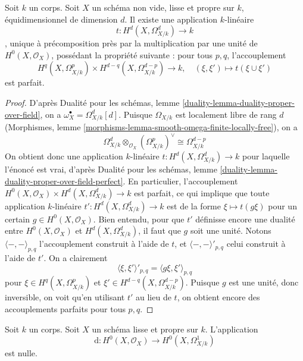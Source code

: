 \begin{lemma}
\label{lemma-duality-hodge}
Soit $k$ un corps. Soit $X$ un schéma non vide, lisse et propre sur $k$,
équidimensionnel de dimension $d$. Il existe une application $k$-linéaire
$$
t : H^d(X, \Omega^d_{X/k}) \longrightarrow k
$$,
unique à précomposition près par la multiplication par une unité de
$H^0(X, \mathcal{O}_X)$, possédant la propriété suivante : pour tous $p, q$, l'accouplement
$$
H^q(X, \Omega^p_{X/k}) \times H^{d - q}(X, \Omega^{d - p}_{X/k})
\longrightarrow
k, \quad
(\xi, \xi') \longmapsto t(\xi \cup \xi')
$$
est parfait.
\end{lemma}

\begin{proof}
D'après Dualité pour les schémas, lemme \ref{duality-lemma-duality-proper-over-field},
on a $\omega_X^\bullet = \Omega^d_{X/k}[d]$.
Puisque $\Omega_{X/k}$ est localement libre de rang $d$
(Morphismes, lemme \ref{morphisms-lemma-smooth-omega-finite-locally-free}),
on a
$$
\Omega^d_{X/k} \otimes_{\mathcal{O}_X} (\Omega^p_{X/k})^\vee
\cong
\Omega^{d - p}_{X/k}
$$
On obtient donc une application $k$-linéaire $t : H^d(X, \Omega^d_{X/k}) \to k$
pour laquelle l'énoncé est vrai, d'après Dualité pour les schémas, lemme
\ref{duality-lemma-duality-proper-over-field-perfect}.
En particulier, l'accouplement
$H^0(X, \mathcal{O}_X) \times H^d(X, \Omega^d_{X/k}) \to k$
est parfait, ce qui implique que toute application $k$-linéaire
$t' : H^d(X, \Omega^d_{X/k}) \to k$ est de la forme
$\xi \mapsto t(g\xi)$ pour un certain $g \in H^0(X, \mathcal{O}_X)$.
Bien entendu, pour que $t'$ définisse encore une dualité
entre $H^0(X, \mathcal{O}_X)$ et $H^d(X, \Omega^d_{X/k})$,
il faut que $g$ soit une unité. Notons $\langle -, - \rangle_{p, q}$
l'accouplement construit à l'aide de $t$, et $\langle -, - \rangle'_{p, q}$
celui construit à l'aide de $t'$. On a clairement
$$
\langle \xi, \xi' \rangle'_{p, q} =
\langle g\xi, \xi' \rangle_{p, q}
$$
pour $\xi \in H^q(X, \Omega^p_{X/k})$ et
$\xi' \in H^{d - q}(X, \Omega^{d - p}_{X/k})$. Puisque $g$ est une unité, donc
inversible, on voit qu'en utilisant $t'$ au lieu de $t$, on obtient encore des accouplements
parfaits pour tous $p, q$.
\end{proof}

\begin{lemma}
\label{lemma-bottom-part-degenerates}
Soit $k$ un corps. Soit $X$ un schéma lisse et propre sur $k$. L'application
$$
\text{d} : H^0(X, \mathcal{O}_X) \to H^0(X, \Omega^1_{X/k})
$$
est nulle.
\end{lemma}

